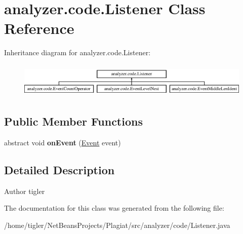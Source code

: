 \hypertarget{classanalyzer_1_1code_1_1Listener}{}\section{analyzer.\+code.\+Listener Class Reference}
\label{classanalyzer_1_1code_1_1Listener}
Inheritance diagram for analyzer.\+code.\+Listener\+:\begin{figure}[H]
\begin{center}
\leavevmode
\includegraphics[height=1.674140cm]{classanalyzer_1_1code_1_1Listener}
\end{center}
\end{figure}
\subsection*{Public Member Functions}
\begin{DoxyCompactItemize}
\item 
\mbox{\label{classanalyzer_1_1code_1_1Listener_aff4550544f22a596b50831e8c9a7e549}} 
abstract void {\bfseries on\+Event} (\hyperlink{classanalyzer_1_1code_1_1Event}{Event} event)
\end{DoxyCompactItemize}


\subsection{Detailed Description}
\begin{DoxyAuthor}{Author}
tigler 
\end{DoxyAuthor}


The documentation for this class was generated from the following file\+:\begin{DoxyCompactItemize}
\item 
/home/tigler/\+Net\+Beans\+Projects/\+Plagiat/src/analyzer/code/Listener.\+java\end{DoxyCompactItemize}
